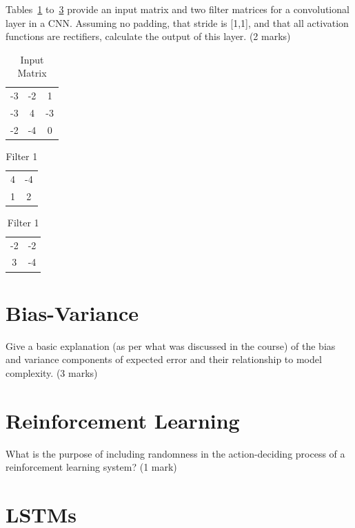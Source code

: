 \documentclass{article}
\begin{document}
Tables~\ref{CNN1} to~\ref{CNN3} provide an input matrix and two filter matrices for a convolutional layer in a CNN. Assuming no padding, that stride is [1,1], and that all activation functions are rectifiers, calculate the output of this layer. (2 marks)
\begin{table}[h!]
\caption{Input Matrix}
\label{CNN1}
\begin{center}
\begin{tabular}{ |c|c|c| } 
\hline
-3  &  -2  &  1 \\
-3  &  4  &  -3 \\
-2  &  -4  &  0 \\
\hline
\end{tabular}
\end{center}
\end{table}
\begin{table}[h!]
\caption{Filter 1}
\label{CNN2}
\begin{center}
\begin{tabular}{ |c|c| } 
\hline
4  &  -4 \\
1  &  2 \\
\hline
\end{tabular}
\end{center}
\end{table}
\begin{table}[h!]
\caption{Filter 1}
\label{CNN3}
\begin{center}
\begin{tabular}{ |c|c| } 
\hline
-2  &  -2 \\
3  &  -4 \\
\hline
\end{tabular}
\end{center}
\end{table}
\clearpage
\section{ Bias-Variance }

Give a basic explanation (as per what was discussed in the course) of the bias and variance components of expected error and their relationship to model complexity. (3 marks)
\clearpage
\section{ Reinforcement Learning }

What is the purpose of including randomness in the action-deciding process of a reinforcement learning system? (1 mark)\clearpage
\section{ LSTMs }
\end{document}
